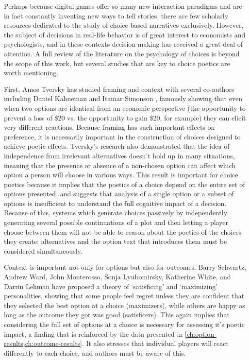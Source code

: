 Perhaps because digital games offer so many new interaction paradigms and are in fact constantly inventing new ways to tell stories, there are few scholarly resources dedicated to the study of choice-based narratives exclusively.
%
However, the subject of decisions in real-life behavior is of great interest to economists and psychologists, and in these contexts decision-making has received a great deal of attention.
%
A full review of the literature on the psychology of choices is beyond the scope of this work, but several studies that are key to choice poetics are worth mentioning.


First, Amos Tversky has studied framing and context with several co-authors including Daniel Kahneman \citep{Tversky1981} and Itamar Simonson \citep{Tversky1993}, famously showing that even when two options are identical from an economic perspective (the opportunity to prevent a loss of \$20 vs\@. the opportunity to gain \$20, for example) they can elicit very different reactions.
%
Because framing has such important effects on preference, it is necessarily important in the construction of choices designed to achieve poetic effects.
%
Tversky's research also demonstrated that the idea of independence from irrelevant alternatives doesn't hold up in many situations, meaning that the presence or absence of a non-chosen option can affect which option a person will choose in various ways.
%
This result is important for choice poetics because it implies that the poetics of a choice depend on the entire set of options presented, and suggests that analysis of a single option or a subset of options is insufficient to understand the full cognitive impact of a decision.
%
Because of this, systems which generate choices passively by independently generating several possible continuations of a plot and then letting a player choose between them will not be able to reason about the poetics of the choices they create: alternatives and the option text that introduces them must be considered simultaneously.


Context is important not only for options but also for outcomes.
%
Barry Schwartz, Andrew Ward, John Monterosso, Sonja Lyubomirsky, Katherine White, and Darrin Lehman have proposed a theory of `satisficing' and `maximizing' personalities, showing that some people feel regret unless they are confident that they selected the best option at a choice (maximizers), while others are happy as long as the outcome they got was good (satisficers).
%
This again implies that considering the full set of options at a choice is necessary for assessing it's poetic impact, a finding that is reinforced by the data presented in \cref{ch:option-results,ch:outcome-results}.
%
It also stresses that individual players will react differently to each choice, and authors must be aware of this.


